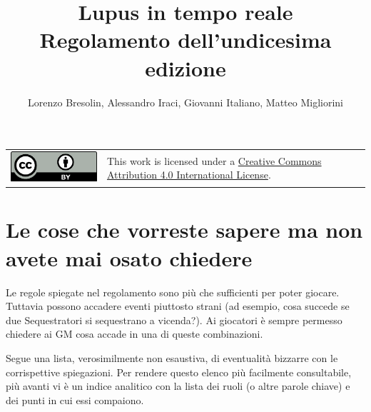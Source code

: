 \documentclass[a4paper,10pt]{article}
\title{Lupus in tempo reale\\ Regolamento dell'undicesima edizione}
\author{Lorenzo Bresolin, Alessandro Iraci, Giovanni Italiano, Matteo Migliorini}
\begin{document}
\maketitle

\begin{tabular}{lp{}}
	\begin{minipage}{0.22\textwidth}
		\vspace{3mm}
		\href{http://creativecommons.org/licenses/by/4.0/}{\includegraphics{ccby.pdf}}
	\end{minipage}
	 &
	This work is licensed under a \href{http://creativecommons.org/licenses/by/4.0/}{Creative Commons Attribution 4.0 International License}.
\end{tabular}

\section*{Le cose che vorreste sapere ma non avete mai osato chiedere}
\label{faq}

Le regole spiegate nel regolamento sono più che sufficienti per poter giocare. Tuttavia possono accadere eventi piuttosto strani (ad esempio, cosa succede se due Sequestratori si sequestrano a vicenda?). Ai giocatori è sempre permesso chiedere ai GM cosa accade in una di queste combinazioni.

Segue una lista, verosimilmente non esaustiva, di eventualità bizzarre con le corrispettive spiegazioni.
Per rendere questo elenco più facilmente consultabile, più avanti vi è un indice analitico con la lista dei ruoli (o altre parole chiave) e dei punti in cui essi compaiono.
\end{document}
